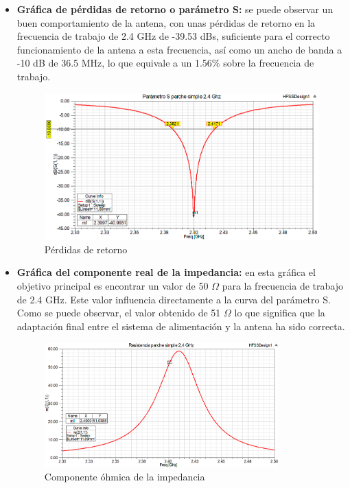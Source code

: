 \begin{itemize}
\item \textbf{Gráfica de pérdidas de retorno o parámetro S: }se puede observar un buen comportamiento de la antena, con unas pérdidas de retorno en la frecuencia de trabajo de 2.4 GHz de -39.53 dBs, suficiente para el correcto funcionamiento de la antena a esta frecuencia, así como un ancho de banda a -10 dB de 36.5 MHz, lo que equivale a un 1.56\% sobre la frecuencia de trabajo.
	\begin{figure}[H]
    \centering
        \includegraphics[width=\textwidth]{archivos/analisis/1x11/1}
        \caption{Pérdidas de retorno}
        \label{fig:s}
	\end{figure}
	
\item \textbf{Gráfica del componente real de la impedancia: }en esta gráfica el objetivo principal es encontrar un valor de 50 $\Omega$ para la frecuencia de trabajo de 2.4 GHz. Este valor influencia directamente a la curva del parámetro S. Como se puede observar, el valor obtenido de 51 $\Omega$ lo que significa que la adaptación final entre el sistema de alimentación y la antena ha sido correcta.
	\begin{figure}[H]
    \centering
        \includegraphics[width=0.85\textwidth]{archivos/analisis/1x11/3}
        \caption{Componente óhmica de la impedancia}
        \label{fig:realimpe}
	\end{figure}
	

\end{itemize}
